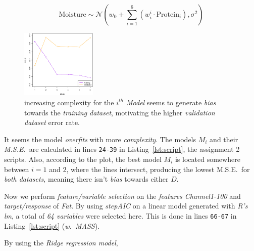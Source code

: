 \documentclass[a4paper, twocolumn]{article}
\begin{document}
    \begin{equation} \label{eq:poly}
        \mathrm{Moisture} \sim \mathcal{N}(w_0 + \sum_{i=1}^6{(w_i^i \cdot \mathrm{Protein}_i)}, \sigma^2)
    \end{equation}

    \begin{figure}[h!]
        \centering
        \caption{increasing complexity for the \emph{$i^{th}$ Model} seems to generate \emph{bias} towards the \emph{training dataset}, motivating the higher \emph{validation dataset} error rate.}
        \label{fig:depends}
        \includegraphics[width=0.32\textwidth]
        {share/depends.eps}
    \end{figure}

    \newpage

    It seems the model \emph{overfits} with more \emph{complexity}. The models $M_i$ and their \emph{M.S.E.}\ are calculated in lines \texttt{24-39} in Listing~\ref{lst:script}, the assignment 2 scripts. Also, according to the plot, the best model $M_i$ is located somewhere between $i = 1$ and $2$, where the lines intersect, producing the lowest M.S.E.\ for \emph{both datasets}, meaning there isn't \emph{bias} towards either $D$.

    Now we perform \emph{feature/variable selection} on the \emph{features Channel1-100} and \emph{target/response} of \emph{Fat}. By using \emph{stepAIC} on a linear model generated with \emph{R's lm}, a total of \emph{64 variables} were selected here. This is done in lines \texttt{66-67} in Listing~\ref{lst:script} (\emph{w.\ MASS}).

    By using the \emph{Ridge regression model},

    \newpage
\end{document}
